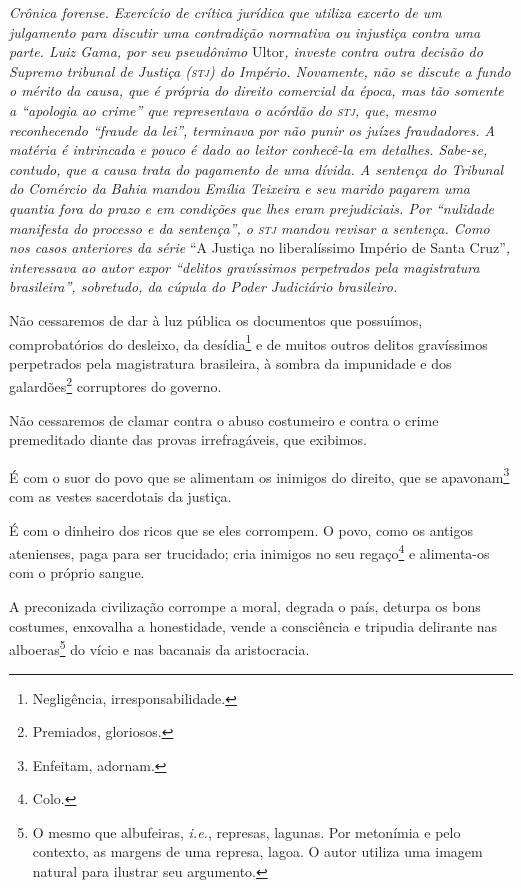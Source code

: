 \begin{didascalia}
\emph{Crônica forense. Exercício de crítica jurídica que utiliza excerto
de um julgamento para discutir uma contradição normativa ou injustiça
contra uma parte. Luiz Gama, por seu pseudônimo} Ultor\emph{, investe
contra outra decisão do Supremo tribunal de Justiça (\textsc{stj}) do Império.
Novamente, não se discute a fundo o mérito da causa, que é própria do
direito comercial da época, mas tão somente a ``apologia ao crime'' que
representava o acórdão do \textsc{stj}, que, mesmo reconhecendo ``fraude da lei'',
terminava por não punir os juízes fraudadores. A matéria é intrincada e
pouco é dado ao leitor conhecê-la em detalhes. Sabe-se, contudo, que a
causa trata do pagamento de uma dívida. A sentença do Tribunal do
Comércio da Bahia mandou Emília Teixeira e seu marido pagarem uma
quantia fora do prazo e em condições que lhes eram prejudiciais. Por
``nulidade manifesta do processo e da sentença'', o \textsc{stj} mandou revisar a
sentença. Como nos casos anteriores da série} ``A Justiça no
liberalíssimo Império de Santa Cruz''\emph{, interessava ao autor expor
``delitos gravíssimos perpetrados pela magistratura brasileira'',
sobretudo, da cúpula do Poder Judiciário brasileiro.}
\end{didascalia}

Não cessaremos de dar à luz pública os documentos que possuímos,
comprobatórios do desleixo, da desídia\footnote{Negligência,
  irresponsabilidade.} e de muitos outros delitos gravíssimos
perpetrados pela magistratura brasileira, à sombra da impunidade e dos
galardões\footnote{Premiados, gloriosos.} corruptores do governo.

Não cessaremos de clamar contra o abuso costumeiro e contra o crime
premeditado diante das provas irrefragáveis, que exibimos.

É com o suor do povo que se alimentam os inimigos do direito, que se
apavonam\footnote{Enfeitam, adornam.} com as vestes sacerdotais da
justiça.

É com o dinheiro dos ricos que se eles corrompem. O povo, como os
antigos atenienses, paga para ser trucidado; cria inimigos no seu
regaço\footnote{Colo.} e alimenta-os com o próprio sangue.

A preconizada civilização corrompe a moral, degrada o país, deturpa os
bons costumes, enxovalha a honestidade, vende a consciência e tripudia
delirante nas alboeras\footnote{ O mesmo que albufeiras,
  \emph{i.e.}, represas, lagunas. Por metonímia e pelo contexto, as
  margens de uma represa, lagoa. O autor utiliza uma imagem natural para
  ilustrar seu argumento.} do vício e nas bacanais da aristocracia.

